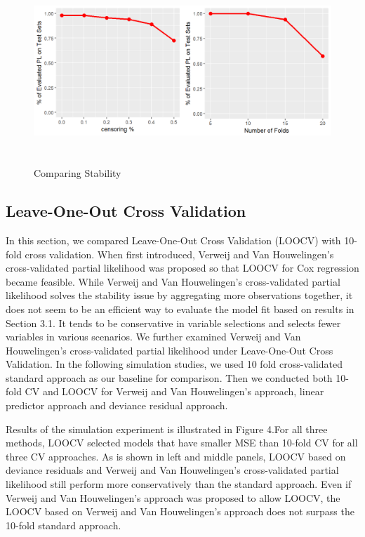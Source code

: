 \begin{figure}[h]
    \centering
		\includegraphics[height= 7cm ]{./figures/figure_3_new.png}
    \caption{Comparing Stability}
\end{figure}	

    \subsection {Leave-One-Out Cross Validation}
	\par In this section, we compared Leave-One-Out Cross Validation (LOOCV) with 10-fold cross validation. When first introduced, Verweij and Van Houwelingen's cross-validated partial likelihood was proposed so that LOOCV for Cox regression became feasible. While Verweij and Van Houwelingen's cross-validated partial likelihood solves the stability issue by aggregating more observations together, it does not seem to be an efficient way to evaluate the model fit based on results in Section 3.1. It tends to be conservative in variable selections and selects fewer variables in various scenarios. We further examined Verweij and Van Houwelingen's cross-validated partial likelihood under Leave-One-Out Cross Validation. In the following simulation studies, we used 10 fold cross-validated standard approach as our baseline for comparison. Then we conducted both 10-fold CV and LOOCV for Verweij and Van Houwelingen's approach, linear predictor approach and deviance residual approach.
	\par Results of the simulation experiment is illustrated in Figure 4.For all three methods, LOOCV selected models that have smaller MSE than 10-fold CV for all three CV approaches. As is shown in left and middle panels, LOOCV based on deviance residuals and Verweij and Van Houwelingen's cross-validated partial likelihood still perform more conservatively than the standard approach. Even if Verweij and Van Houwelingen's approach was proposed to allow LOOCV, the LOOCV based on Verweij and Van Houwelingen's approach does not surpass the 10-fold standard approach.

